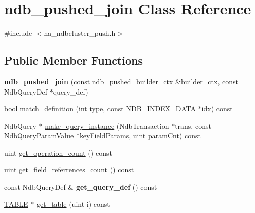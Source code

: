 \hypertarget{classndb__pushed__join}{}\section{ndb\+\_\+pushed\+\_\+join Class Reference}
\label{classndb__pushed__join}


{\ttfamily \#include $<$ha\+\_\+ndbcluster\+\_\+push.\+h$>$}

\subsection*{Public Member Functions}
\begin{DoxyCompactItemize}
\item 
\mbox{\label{classndb__pushed__join_a93bd4ab3a4b6c633bf7aad9dbcda9cde}} 
{\bfseries ndb\+\_\+pushed\+\_\+join} (const \mbox{\hyperlink{classndb__pushed__builder__ctx}{ndb\+\_\+pushed\+\_\+builder\+\_\+ctx}} \&builder\+\_\+ctx, const Ndb\+Query\+Def $\ast$query\+\_\+def)
\item 
bool \mbox{\hyperlink{classndb__pushed__join_a3f7d75c3ba2a72c63b32f030a7a57ad5}{match\+\_\+definition}} (int type, const \mbox{\hyperlink{structndb__index__data}{N\+D\+B\+\_\+\+I\+N\+D\+E\+X\+\_\+\+D\+A\+TA}} $\ast$idx) const
\item 
Ndb\+Query $\ast$ \mbox{\hyperlink{classndb__pushed__join_ac304528e069d75bf6283d9630a346d4e}{make\+\_\+query\+\_\+instance}} (Ndb\+Transaction $\ast$trans, const Ndb\+Query\+Param\+Value $\ast$key\+Field\+Params, uint param\+Cnt) const
\item 
uint \mbox{\hyperlink{classndb__pushed__join_a96ff16fa8e23fd510f5f9a4fc52f3327}{get\+\_\+operation\+\_\+count}} () const
\item 
uint \mbox{\hyperlink{classndb__pushed__join_a22900c182d2a4368cd9c77bb16707b55}{get\+\_\+field\+\_\+referrences\+\_\+count}} () const
\item 
\mbox{\label{classndb__pushed__join_a619a26a94cc84d32bd785e0d39cb6766}} 
const Ndb\+Query\+Def \& {\bfseries get\+\_\+query\+\_\+def} () const
\item 
\mbox{\hyperlink{structTABLE}{T\+A\+B\+LE}} $\ast$ \mbox{\hyperlink{classndb__pushed__join_a4963eabe39daf55f3a48612ad838f40e}{get\+\_\+table}} (uint i) const
\end{DoxyCompactItemize}
